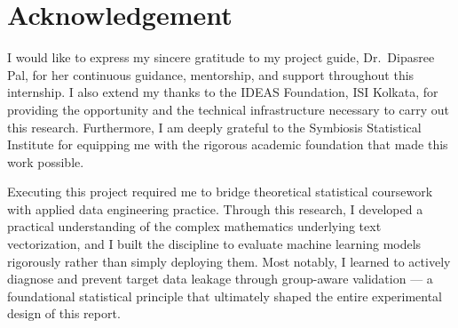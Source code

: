 \chapter{Acknowledgement}
\label{ch:acknowledgement}

I would like to express my sincere gratitude to my project guide, Dr.\ Dipasree Pal, for her continuous guidance, mentorship, and support throughout this internship. I also extend my thanks to the IDEAS Foundation, ISI Kolkata, for providing the opportunity and the technical infrastructure necessary to carry out this research. Furthermore, I am deeply grateful to the Symbiosis Statistical Institute for equipping me with the rigorous academic foundation that made this work possible.

Executing this project required me to bridge theoretical statistical coursework with applied data engineering practice. Through this research, I developed a practical understanding of the complex mathematics underlying text vectorization, and I built the discipline to evaluate machine learning models rigorously rather than simply deploying them. Most notably, I learned to actively diagnose and prevent target data leakage through group-aware validation --- a foundational statistical principle that ultimately shaped the entire experimental design of this report.